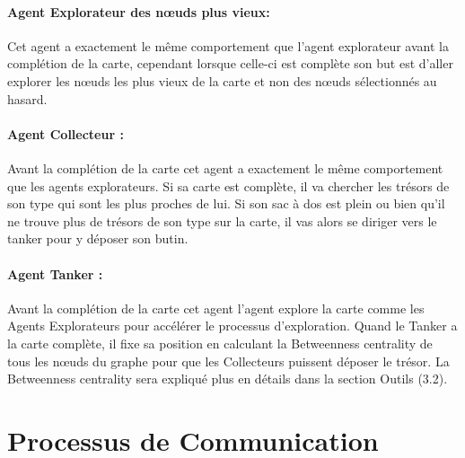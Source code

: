 \documentclass[10pt]{article}
\begin{document}
\paragraph{Agent Explorateur des n\oe{}uds plus vieux:}
Cet agent a exactement le même comportement que l'agent explorateur avant la complétion de la carte, cependant lorsque celle-ci est complète son but est d'aller explorer les n\oe{}uds les plus vieux de la carte et non des n\oe{}uds sélectionnés au hasard.

\paragraph{Agent Collecteur :} Avant la complétion de la carte cet agent a exactement le même comportement que les agents explorateurs. Si sa carte est complète, il va chercher les trésors de son type qui sont les plus proches de lui. Si son sac à dos est plein ou bien qu'il ne trouve plus de trésors de son type sur la carte, il vas alors se diriger vers le tanker pour y déposer son butin.

\paragraph{Agent Tanker :} Avant la complétion de la carte cet agent l'agent explore la carte comme les Agents Explorateurs pour accélérer le processus d'exploration. Quand le Tanker a la carte complète, il fixe sa position en calculant la Betweenness centrality de tous les n\oe{}uds du graphe pour que les Collecteurs puissent déposer le trésor. La Betweenness centrality sera expliqué plus en détails dans la section Outils (3.2).

\section{Processus de Communication}
\end{document}
